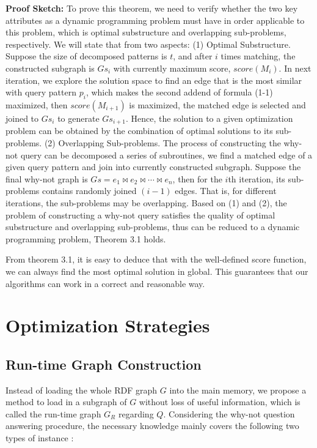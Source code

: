 \documentclass{article}
\begin{document}
\textbf{Proof Sketch:} To prove this theorem, we need to verify whether the two key attributes as a dynamic programming problem must have in order applicable to this problem, which is optimal substructure and overlapping sub-problems, respectively. We will state that from two aspects:
(1) Optimal Substructure. Suppose the size of decomposed patterns is $t$, and after $i$ times matching, the constructed subgraph is $Gs_i$ with currently maximum score, $score(M_i)$. In next iteration, we explore the solution space to find an edge that is the most similar with query pattern $p_i$, which makes the second addend of formula (1-1) maximized, then $score(M_{i+1})$ is maximized, the matched edge is selected and joined to $Gs_i$ to generate $Gs_{i+1}$. Hence, the solution to a given optimization problem can be obtained by the combination of optimal solutions to its sub-problems.
(2) Overlapping Sub-problems. The process of constructing the why-not query can be decomposed a series of subroutines, we find a matched edge of a given query pattern and join into currently constructed subgraph. Suppose the final why-not graph is $Gs = e_1 \bowtie e_2 \bowtie \cdots \bowtie e_n$, then for the $i$th iteration, its sub-problems contains randomly joined $(i-1)$ edges. That is, for different iterations, the sub-problems may be overlapping.
Based on (1) and (2), the problem of constructing a why-not query satisfies the quality of optimal substructure and overlapping sub-problems, thus can be reduced to a dynamic programming problem, Theorem 3.1 holds.

From theorem 3.1, it is easy to deduce that with the well-defined score function, we can always find the most optimal solution in global. This guarantees that our algorithms can work in a correct and reasonable way.


\section{Optimization Strategies}

\subsection{Run-time Graph Construction}

Instead of loading the whole RDF graph $G$ into the main memory, we propose a method to load in a subgraph of $G$ without loss of useful information, which is called the run-time graph $G_R$ regarding $Q$. Considering the why-not question answering procedure, the necessary knowledge mainly covers the following two types of instance :
\end{document}
